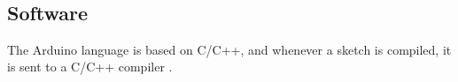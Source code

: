 
\begin{minipage}{\linewidth}%
\label{pull_down}
\end{minipage}\\

\subsection{Software}

The Arduino language is based on C/C++, and whenever a sketch is compiled, it is sent to a C/C++ compiler \citep{Arduino_FAQ}.

